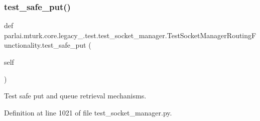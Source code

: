 \subsubsection{\texorpdfstring{test\+\_\+safe\+\_\+put()}{test\_safe\_put()}}
{\footnotesize\ttfamily def parlai.\+mturk.\+core.\+legacy\+\_.\+test.\+test\+\_\+socket\+\_\+manager.\+Test\+Socket\+Manager\+Routing\+Functionality.\+test\+\_\+safe\+\_\+put (\begin{DoxyParamCaption}\item[{}]{self }\end{DoxyParamCaption})}

\begin{DoxyVerb}Test safe put and queue retrieval mechanisms.
\end{DoxyVerb}
 

Definition at line 1021 of file test\+\_\+socket\+\_\+manager.\+py.



